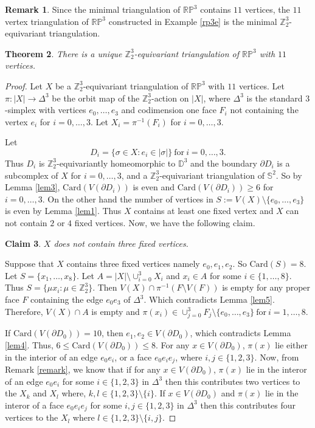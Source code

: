 \documentclass[11pt]{amsart}
\numberwithin{equation}{section}
\newtheorem{theorem}{Theorem}[section]
\newtheorem{claim}[theorem]{Claim}
\theoremstyle{definition}
\newtheorem{remark}[theorem]{Remark}
\newcommand{\Sp}{\mathbb{S}}
\def \bb{\mathbb}
\def \ZZ{{\bb{Z}}}
\begin{document}
\begin{remark}
Since the minimal triangulation of $\mathbb{RP}^3$ contains $11$ vertices, the $11$ vertex triangulation of $\mathbb{RP}^3$ constructed in Example \ref{rp3e} is  the minimal $\ZZ_2^3$-equivariant triangulation. 
\end{remark}


\begin{theorem}\label{thm3}
There is a unique $\ZZ_2^3$-equivariant triangulation of $\mathbb{RP}^3$ with $11$ vertices.
\end{theorem}
\begin{proof}
Let $X$ be a $\ZZ_2^3$-equivariant triangulation of $\mathbb{RP}^3$
with $11$ vertices. Let $\pi : |X| \to \Delta^3$ be the orbit map of the $\ZZ_2^3$-action on $|X|$,
where $\Delta^3$ is the standard $3$-simplex with vertices $e_0, \ldots, e_3$ and codimension one face $F_i$
not containing the vertex $e_i$ for $i=0, \ldots, 3$. Let $X_i = \pi^{-1}(F_i)$ for $i=0, \ldots, 3$.


 Let $$D_{i}=\{\sigma \in X : e_i \in |\sigma|\} ~ \mbox{for} ~ i=0, \ldots, 3.$$
Thus $D_{i}$ is $\ZZ_2^3$-equivariantly homeomorphic to $\mathbb{D}^3$ and the boundary $\partial{D_i}$ is a
subcomplex of $X$ for $i= 0, \ldots, 3$, and a $\ZZ_2^3$-equivariant triangulation of $\Sp^2$. So by Lemma \ref{lem3}, $\mathrm{Card}(V(\partial{D_{i}}))$ is even and
$\mathrm{Card}(V(\partial{D_{i}})) \geq 6$ for $i=0, \ldots, 3$. On the other hand the number of vertices in
$S := V(X)\setminus\{e_0, \ldots, e_3\}$ is even by Lemma \ref{lem1}.
Thus $X$ contains at least one fixed vertex and $X$ can not contain $2$ or $4$ fixed vertices.
  Now, we have the following claim.
\begin{claim}\label{claim}
$X$ does not contain three fixed vertices.
\end{claim}

Suppose that $X$ contains three fixed vertices
namely $e_0, e_1, e_2$. So $\mathrm{Card}(S) = 8$. Let $S = \{x_1, \ldots, x_8\}$. 
Let $A = |X|\setminus \cup_{i=0}^3 X_i$ and $x_i \in A$ for some $i \in \{1, \ldots, 8\}$.
Thus $S = \{\mu x_i : \mu\in \ZZ_2^3\}$. Then $V(X) \cap \pi^{-1}(F\setminus V(F))$ is empty for any proper face $F$ containing the edge $e_0e_3$ of $\Delta^3$. Which contradicts Lemma \ref{lem5}. Therefore, $V(X) \cap A$ is empty and $\pi(x_i) \in \cup_{j=0}^3 F_j\setminus \{e_0, \ldots, e_3\}~ \mbox{for} ~ i=1, \ldots, 8.$

If $\mathrm{Card}(V(\partial{D_0})) = 10$, then $e_1,e_2\in V(\partial{D_0})$, which contradicts Lemma \ref{lem4}. Thus, $6\leq \mathrm{Card}(V(\partial{D_0}))\leq 8$. 
For any $x\in V(\partial{D_0})$, $\pi(x)$ lie either in the interior of an edge $e_0e_i$, or a face $e_0e_ie_j$, where $i,j\in\{1,2,3\}$. Now, from Remark \ref{remark}, we know that if for any $x\in V(\partial{D_0})$,  $\pi(x)$ lie in the interor of an edge $e_0e_i$ for some $i\in\{1,2,3\}$ in $\Delta^3$ then this contributes two vertices to the $X_k$ and $X_l$ where,   $k,l\in\{1,2,3\}\setminus\{i\}$. If $x\in V(\partial{D_0})$ and $\pi(x)$ lie in the interor of a face $e_0e_ie_j$ for some $i,j\in\{1,2,3\}$ in $\Delta^3$ then this contributes four vertices to the $X_l$ where $l\in\{1,2,3\}\setminus\{i,j\}$. 


\end{proof}
\end{document}
